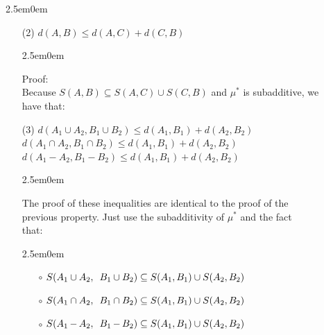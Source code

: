 \documentclass{book}
\newcommand{\hThree}{%
   \color{PineGreen!85!Orange}
   \fontsize{13}{15}\selectfont%
}
\newenvironment{myIndent}{%
   \begin{adjustwidth}{2.5em}{0em}%
}{%
   \end{adjustwidth}%
}
\newcommand{\myHS}{ \hspace{0.5em}}
\newcommand{\retTwo}{\hfill\bigbreak}
\begin{document}
{\begin{myIndent}
\begin{itemize}
{\begin{myIndent}
         The second identity is true because $S(A, A) = \emptyset$ and $\emptyset \in \mathcal{E}$. So,\\ $d(A, A) = \mu^*(S(A, A)) = \mu^*(\emptyset) = \mu(\emptyset) = 0$.\retTwo
      \end{myIndent}}

      \item[(2)] $d(A, B) \leq d(A, C) + d(C, B)$
      {\begin{myIndent}\hThree
         Proof:\\
         Because $S(A, B) \subseteq S(A, C) \cup S(C, B)$ and $\mu^*$ is subadditive, we\\ have that:

         {\retTwo\par}
      \end{myIndent}}

      \item[(3)] $d(A_1 \cup A_2, B_1 \cup B_2) \leq d(A_1, B_1) + d(A_2, B_2)$\\ $d(A_1 \cap A_2, B_1 \cap B_2) \leq d(A_1, B_1) + d(A_2, B_2)$\\ $d(A_1 \mathop{-} A_2, B_1 \mathop{-} B_2) \leq d(A_1, B_1) + d(A_2, B_2)$
      {\begin{myIndent}\hThree
         The proof of these inequalities are identical to the proof of the\\ previous property. Just use the subadditivity of $\mu^*$ and the fact\\ that:
         \begin{myIndent}
            \begin{itemize}
               \item[$\circ$] $S(A_1 \cup A_2,\myHS B_1 \cup B_2) \subseteq S(A_1, B_1) \cup S(A_2, B_2)$\\ [-16pt]
               \item[$\circ$] $S(A_1 \cap A_2,\myHS B_1 \cap B_2) \subseteq S(A_1, B_1) \cup S(A_2, B_2)$\\ [-16pt]
               \item[$\circ$] $S(A_1 \mathop{-} A_2,\myHS B_1 \mathop{-} B_2) \subseteq S(A_1, B_1) \cup S(A_2, B_2)$
            \end{itemize}
         \end{myIndent}
      \end{myIndent}}


\end{itemize}
\end{myIndent}}
\end{document}

